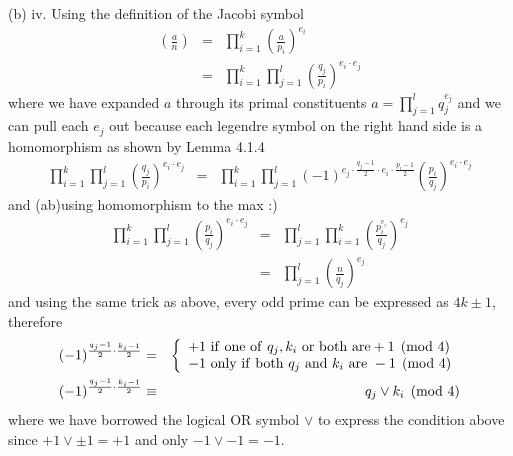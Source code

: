 \documentclass[aps,preprint,preprintnumbers,nofootinbib,showpacs,prd]{revtex4-1}
\newcommand{\nbea}{\begin{eqnarray*}}
\newcommand{\neea}{\end{eqnarray*}}
\begin{document}
(b) iv. Using the definition of the Jacobi symbol
%
\nbea
\left ( \frac{a}{n}\right ) & = & \prod_{i=1}^k \left ( \frac{a}{p_i} \right )^{e_i} \\
& = & \prod_{i=1}^k\prod_{j=1}^l \left ( \frac{q_j}{p_i} \right )^{e_i\cdot e_j} 
\neea
%
where we have expanded $a$ through its primal constituents $a = \prod_{j=1}^l q_j^{e_j}$ and we can pull each $e_j$ out because each legendre symbol on the right hand side is a homomorphism as shown by Lemma 4.1.4
%
\nbea
\prod_{i=1}^k\prod_{j=1}^l \left ( \frac{q_j}{p_i} \right )^{e_i\cdot e_j} & = & \prod_{i=1}^k\prod_{j=1}^l (-1)^{e_j\cdot\frac{q_j-1}{2}\cdot e_i\cdot \frac{p_i-1}{2}} \left ( \frac{p_i}{q_j} \right )^{e_i\cdot e_j} 
\neea
%
and (ab)using homomorphism to the max :)
%
\nbea
\prod_{i=1}^k\prod_{j=1}^l \left ( \frac{p_i}{q_j} \right )^{e_i\cdot e_j} & = & \prod_{j=1}^l \prod_{i=1}^k \left ( \frac{p_i^{e_i}}{q_j} \right )^{e_j} \\
& = & \prod_{j=1}^l \left ( \frac{n}{q_j} \right )^{e_j}
\neea
%
and using the same trick as above, every odd prime can be expressed as $4k\pm1$, therefore
%
\nbea
(-1)^{\frac{q_j-1}{2}\cdot\frac{k_i-1}{2}} & = & \left \{
\begin{array}{l}
+1 {\rm~if~one~of~} q_j, k_i {\rm~or~both~are} +1 \pmod{4} \\
-1 {\rm~only~if~both~} q_j {\rm~and~} k_i {\rm~are~} -1 \pmod{4}  
\end{array}
\right . \\
(-1)^{\frac{q_j-1}{2}\cdot\frac{k_i-1}{2}} & \equiv & q_j \lor k_i \pmod{4}
\neea
%
where we have borrowed the logical OR symbol $\lor$ to express the condition above since $+1 \lor \pm 1 = +1$ and only $-1 \lor -1 = -1$.
\end{document}
